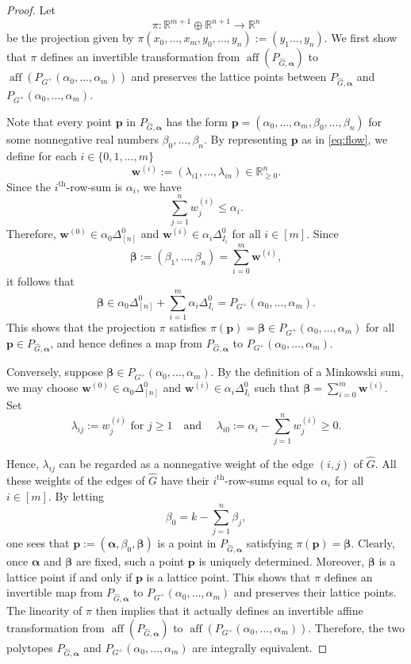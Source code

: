 \documentclass[10pt,a4paper]{amsart}
\newcommand{\R}{\mathbb{R}}
\newcommand{\aff}{\operatorname{aff}}
\newcommand{\vct}[1]{\boldsymbol{#1}}
\begin{document}
\begin{proof} Let
\[
\pi:\R^{m+1}\oplus\R^{n+1}\longrightarrow\R^{n}
\]
be the projection given by $\pi(x_0,\dots, x_m,y_0,\dots, y_n) := (y_1\dots, y_n)$. We first show that $\pi$ defines an invertible transformation from $\aff(P_{\widehat G,\vct{\alpha}})$ to $\aff(P_{G^+}(\alpha_0,\dots,\alpha_m))$ and preserves the lattice points between $P_{\widehat G,\vct{\alpha}}$ and $P_{G^+}(\alpha_0,\dots,\alpha_m)$. 

Note that every point $\vct{p}$ in $P_{\widehat G,\vct{\alpha}}$
 has the form $\vct{p}=(\alpha_0,\dots,\alpha_m,\beta_0,\dots, \beta_n)$
 for some nonnegative real numbers $\beta_0,\dots, \beta_n.$ By representing $\vct{p}$ as in \eqref{eq:flow}, we define for each $i\in\{0,1,\ldots,m\}$
\[
\vct{w}^{(i)}:=(\lambda_{i1},\ldots,\lambda_{in})\in\R_{\ge0}^n.
\]
Since the $i^{\mathrm{th}}$-row-sum is $\alpha_i$, we have
\[
\sum_{j=1}^n w_j^{(i)}\le\alpha_i.
\]
Therefore,
$\vct{w}^{(0)}\in\alpha_0\Delta_{[n]}^0$ and $\vct{w}^{(i)}\in\alpha_i\Delta_{I_i}^0$ for all $i\in [m]$. Since
\[
\vct{\beta}:=(\beta_1,\ldots,\beta_n)
=\sum_{i=0}^m\vct{w}^{(i)},
\]
it follows that
\[
\vct{\beta}
\in\alpha_0\Delta_{[n]}^0+\sum_{i=1}^m\alpha_i\Delta_{I_i}^0
=P_{G^+}(\alpha_0,\ldots,\alpha_m).
\]
This shows that the projection $\pi$ satisfies $\pi(\vct{p}) = \vct{\beta} \in P_{G^+}(\alpha_0,\dots, \alpha_m)$ for all $\vct{p} \in P_{\widehat G,\vct{\alpha}}$, and hence defines a map from $P_{\widehat G,\vct{\alpha}}$ to $P_{G^+}(\alpha_0,\dots, \alpha_m).$ 

Conversely, suppose
$\vct{\beta}\in P_{G^+}(\alpha_0,\ldots,\alpha_m).$ By the definition of a Minkowski sum, we may choose $\vct{w}^{(0)}\in\alpha_0\Delta_{[n]}^0$ and $
\vct{w}^{(i)}\in\alpha_i\Delta_{I_i}^0$
such that $\vct{\beta}=\sum^m_{i=0}\vct{w}^{(i)}$. Set
\[
\lambda_{ij}:=w_j^{(i)} \text{ for }j\ge1
\quad \text{and } \quad
\lambda_{i0}:=\alpha_i-\sum_{j=1}^n w_j^{(i)}\ge0.
\]

Hence, $\lambda_{ij}$ can be regarded as a nonnegative weight of the edge $(i,j)$ of $\widehat G$. All these weights of the edges of $\widehat G$ have their $i^{\mathrm{th}}$-row-sums equal to $\alpha_i$ for all $i \in [m]$. By letting
\[
\beta_0=k-\sum_{j=1}^n\beta_j,
\]
one sees that $\vct{p}:=(\vct{\alpha},\beta_0,\vct{\beta})$ is a point in $P_{\widehat G, \vct{\alpha}}$ satisfying $\pi(\vct{p}) = \vct{\beta}.$  Clearly, once $\vct{\alpha}$ and $\vct{\beta}$ are fixed, such a point $\vct{p}$ is uniquely determined. Moreover, $\vct{\beta}$ is a lattice point if and only if $\vct{p}$ is a lattice point. This shows that $\pi$ defines an invertible map from  $P_{\widehat G,\vct{\alpha}}$ to $P_{G^+}(\alpha_0,\dots, \alpha_m)$ and preserves their lattice points. The linearity of $\pi$ then implies that it actually defines an invertible affine transformation from $\aff(P_{\widehat G,\vct{\alpha}})$ to $\aff(P_{G^+}(\alpha_0,\dots,\alpha_m))$. Therefore, the two polytopes $P_{\widehat G,\vct{\alpha}}$ and $P_{G^+}(\alpha_0,\dots,\alpha_m)$ are integrally equivalent.



\end{proof}
\end{document}
